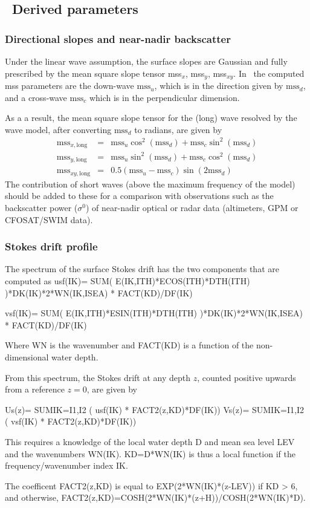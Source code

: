 \vssub
\subsection{~Derived parameters} \label{sub:outpars}
\vssub

\subsubsection{Directional slopes and near-nadir backscatter}
Under the linear wave assumption, the surface slopes are Gaussian and fully prescribed by the 
mean square slope tensor mss$_x$, mss$_y$, mss$_{xy}$. In \ws\ the computed mss parameters are the down-wave $\mathrm{mss}_u$, which is 
in the direction given by $\mathrm{mss}_d$, and a cross-wave $\mathrm{mss}_c$ which is in the perpendicular dimension. 

As a a result, the 
mean square slope tensor for the (long) wave resolved by the wave model, after converting $\mathrm{mss}_d$ to radians, are given by 
\begin{eqnarray}
   \mathrm{mss}_{x,\mathrm{long}} &=& \mathrm{mss}_u \cos^2(\mathrm{mss}_d)+\mathrm{mss}_c \sin^2(\mathrm{mss}_d) \\
   \mathrm{mss}_{y,\mathrm{long}} &=& \mathrm{mss}_u \sin^2(\mathrm{mss}_d)+\mathrm{mss}_c \cos^2(\mathrm{mss}_d) \\
   \mathrm{mss}_{xy,\mathrm{long}}&=&0.5 (\mathrm{mss}_u - \mathrm{mss}_c) \sin(2 \mathrm{mss}_d)
\end{eqnarray}
The contribution of short waves (above the maximum frequency of the model) should be added to these for a comparison with observations 
such as the backscatter power ($\sigma^0$) of near-nadir optical or radar data (altimeters, GPM or CFOSAT/SWIM data).
   
\subsubsection{Stokes drift profile}
The spectrum of the surface Stokes drift has the two components that are computed as 
{\code usf(IK)= SUM( E(IK,ITH)*ECOS(ITH)*DTH(ITH) )*DK(IK)*2*WN(IK,ISEA) *  FACT(KD)/DF(IK)}

{\code vsf(IK)= SUM( E(IK,ITH)*ESIN(ITH)*DTH(ITH) )*DK(IK)*2*WN(IK,ISEA) *  FACT(KD)/DF(IK)}

Where WN is the wavenumber and FACT(KD) is a function of the non-dimensional water depth.

From this spectrum, the Stokes drift at any depth $z$, counted positive upwards from a reference $z=0$, are given by

Us(z)= SUM{IK=I1,I2} ( usf(IK) * FACT2(z,KD)*DF(IK))
Vs(z)= SUM{IK=I1,I2} ( vsf(IK) * FACT2(z,KD)*DF(IK))

This requires a knowledge of the local water depth D and mean sea level LEV and the wavenumbers WN(IK). KD=D*WN(IK) is thus a local function if the frequency/wavenumber index IK.

The coefficent FACT2(z,KD) is equal to EXP(2*WN(IK)*(z-LEV)) if KD > 6, and otherwise, FACT2(z,KD)=COSH(2*WN(IK)*(z+H))/COSH(2*WN(IK)*D).
